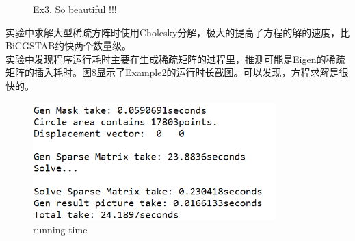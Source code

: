 \documentclass[12pt]{article}
\begin{document}
		\begin{figure}[H]
			\centering
			\centering
			\caption{Ex3. So beautiful !!!}
		\end{figure}
	
	实验中求解大型稀疏方阵时使用Cholesky分解，极大的提高了方程的解的速度，比BiCGSTAB约快两个数量级。\\
	
	
	实验中发现程序运行耗时主要在生成稀疏矩阵的过程里，推测可能是Eigen的稀疏矩阵的插入耗时。图8显示了Example2的运行时长截图。可以发现，方程求解是很快的。
	
	\begin{figure}[H]
		\centering
		\includegraphics[width=3.7in]{./time.png}
		\centering
		\caption{running time}
	\end{figure}
\end{document}
